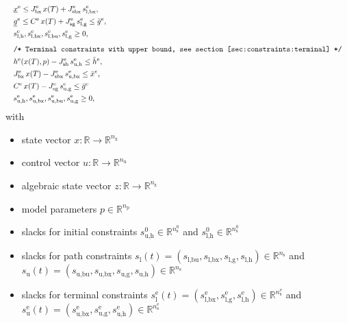 \documentclass[english]{article}
\newcommand{\ind}[1]{_{\textrm{#1}}}
\newcommand{\terminal}{^{\textrm{e}}}
\newcommand{\initial}{^{\textrm{0}}}
\newcommand{\Lower}{\ind{l}}
\newcommand{\lowerh}{\ind{l,h}}
\newcommand{\lowerbx}{\ind{l,bx}}
\newcommand{\lowerbu}{\ind{l,bu}}
\newcommand{\lowerg}{\ind{l,g}}
\newcommand{\upper}{\ind{u}}
\newcommand{\upperh}{\ind{u,h}}
\newcommand{\upperbx}{\ind{u,bx}}
\newcommand{\upperbu}{\ind{u,bu}}
\newcommand{\upperg}{\ind{u,g}}
\newcommand{\mathComment}[1]{\texttt{/* #1 */}}
\newcommand{\R}{\mathbb{R}}
\newcommand{\nx}{n\ind{x}}
\newcommand{\nuu}{n\ind{u}}
\newcommand{\nz}{n\ind{z}}
\newcommand{\np}{n\ind{p}}
\newcommand{\ns}{n\ind{s}}
\begin{document}
\begin{align}
    &&&\underline{x}\terminal \leq J_{\textrm{bx}}\terminal\, x(T) + J\ind{sbx}\terminal\, s\lowerbx\terminal, &&\\ %
    &&&\underline{g}\terminal \leq C\terminal\, x(T) + J\ind{sg}\terminal\, s\lowerg\terminal \leq \bar{g}\terminal, && \\
    &&& s\lowerh\terminal, s\lowerbx\terminal, s\lowerbu\terminal, s\lowerg\terminal \geq 0, \label{eq:constraints:terminal:lower_bounds:end}\\[1ex]
    &&&\mathComment{Terminal constraints with upper bound, see section \ref{sec:constraints:terminal}}\nonumber\\
    &&& h\terminal(x(T), p) - J\ind{sh}\terminal\, s\ind{u,h}\terminal \leq \bar{h}\terminal, &&\label{eq:constraints:terminal:upper_bounds:start}\\
    &&& J_{\textrm{bx}}\terminal\, x(T) - J\ind{sbx}\terminal\, s\ind{u,bx}\terminal \leq \bar{x}^{e}, &&\\ %
    &&& C\terminal\, x(T) - J\ind{sg}\terminal\, s\ind{u,g}\terminal \leq \bar{g}\terminal \\
    &&& s\upperh\terminal, s\upperbx\terminal, s\upperbu\terminal, s\upperg\terminal \geq 0,\label{eq:constraints:terminal:upper_bounds:end}
\end{align}
%
with
\begin{itemize}
\item state vector $ x: \R \rightarrow \R^{\nx} $
\item control vector $ u: \R \rightarrow \R^{\nuu} $
\item algebraic state vector $ z: \R \rightarrow \R^{\nz} $
\item model parameters $ p \in \R^{\np} $
\item slacks for initial constraints $s\ind{u,h}\initial \in \R^{\ns\initial}$ and $s\ind{l,h}\initial \in \R^{\ns\initial}$
\item slacks for path constraints $ s\Lower(t) = (s\lowerbu, s\lowerbx, s\lowerg, s\lowerh) \in \R^{\ns} $ and $ s\upper(t) = (s\upperbu, s\upperbx, s\upperg, s\upperh) \in \R^{\ns} $
\item slacks for terminal constraints $ s\Lower\terminal(t) = (s\lowerbx\terminal, s\lowerg\terminal, s\lowerh\terminal) \in \R^{\ns\terminal} $ and $ s\upper\terminal(t) = (s\upperbx\terminal, s\upperg\terminal, s\upperh\terminal) \in \R^{\ns\terminal} $
\end{itemize}
\end{document}

